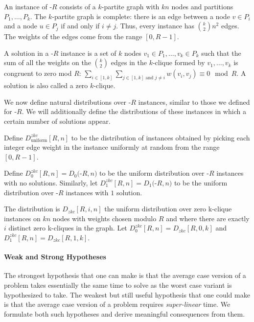 \begin{definition}
An instance of \zkclique-$R$ consists of a $k$-partite graph with $kn$ nodes and 
partitions $P_1, \ldots, P_k$. The $k$-partite graph is complete: there is an edge between a node  $v\in P_i$ and a node $u \in P_j$ if and only if $i \ne j$. Thus, every instance has $\binom k 2 n^2$ edges. The weights of the edges come from the range $[0,R-1]$.

	
	A solution in a \zkclique-$R$ instance is a set of $k$ nodes $v_1 \in P_1, \ldots, v_k \in P_k$ such that the sum of all the weights on the $\binom{k}{2}$ edges in the $k$-clique formed by $v_1,\ldots,v_k$ is congruent to zero mod $R$: $\sum_{i \in [1,k]}\sum_{j \in [1,k] \text{ and } j\ne i} w(v_i,v_j) \equiv 0 \mod R$. A solution is also called a  zero $k$-clique. 
\end{definition}

We now define natural distributions over \zkclique-$R$ instances, similar to those we defined for \kSum-$R$.
We will additionally define the distributions of these instances in which a certain number of solutions appear. 

\begin{definition}
Define $D^{zkc}_{\textrm{uniform}}[R,n]$ to be the distribution of instances obtained by picking each integer edge weight in the instance uniformly at random from the range $[0,R-1]$.

Define $D^{zkc}_{0}[R,n] = D_0($\zkclique-$R, n)$ to be the uniform distribution over \zkclique-$R$ instances with no solutions. Similarly, let $D^{zkc}_{1}[R,n] = D_1($\zkclique-$R, n)$ to be the uniform distribution over \zkclique-$R$  instances with $1$ solution.

The distribution is $D_{zkc}[R,i,n]$ the uniform distribution over zero k-clique instances on $kn$ nodes with weights chosen modulo $R$ and where there are exactly $i$ distinct zero k-cliques in the graph.
Let $D^{zkc}_{0}[R,n] = D_{zkc}[R,0,k]$  and $D^{zkc}_{1}[R,n] = D_{zkc}[R,1,k]$.
\end{definition}

\paragraph{Weak and Strong Hypotheses}
The strongest hypothesis that one can make is that the average case version of a problem takes essentially the same time to solve as the worst case variant is hypothesized to take. The weakest but still useful hypothesis that one could make is that the average case version of a problem requires {\em super-linear} time. We formulate both such hypotheses and derive meaningful consequences from them.


